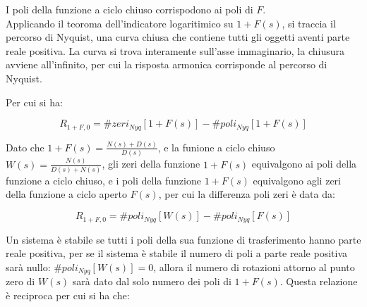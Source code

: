 \documentclass{article}
\numberwithin{equation}{subsection}
\begin{document}
I poli della funzione a ciclo chiuso corrispodono ai poli di $F$. \\
Applicando il teoroma dell'indicatore logaritimico su $1+F(s)$, si traccia il percorso di Nyquist, una curva chiusa che contiene tutti gli oggetti aventi parte reale 
positiva. La curva si trova interamente sull'asse immaginario, la chiusura avviene all'infinito, per cui la risposta armonica corrisponde al percorso di Nyquist. 

\begin{center}
\end{center}

Per cui si ha: 

\begin{equation}
    R_{1+F,0}=\#zeri_{Nyq}[1+F(s)]-\#poli_{Nyq}[1+F(s)]
\end{equation}

Dato che $1+F(s)=\displaystyle\frac{N(s)+D(s)}{D(s)}$, e la funione a ciclo chiuso $W(s)=\displaystyle\frac{N(s)}{D(s)+N(s)}$, gli zeri della funzione $1+F(s)$ equivalgono ai 
poli della funzione a ciclo chiuso, e i poli della funzione $1+F(s)$ equivalgono agli zeri della funzione a ciclo aperto $F(s)$, per cui la differenza poli zeri è data da: 

\begin{equation}
    R_{1+F,0}=\#poli_{Nyq}[W(s)]-\#poli_{Nyq}[F(s)]
\end{equation}

Un sistema è stabile se tutti i poli della sua funzione di trasferimento hanno parte reale positiva, per se il sistema è stabile il numero di poli a parte reale positiva 
sarà nullo: $\#poli_{Nyq}[W(s)]=0$, allora il numero di rotazioni attorno al punto zero di $W(s)$ sarà dato dal solo numero dei poli di $1+F(s)$. Questa relazione è 
reciproca per cui si ha che:
\end{document}
